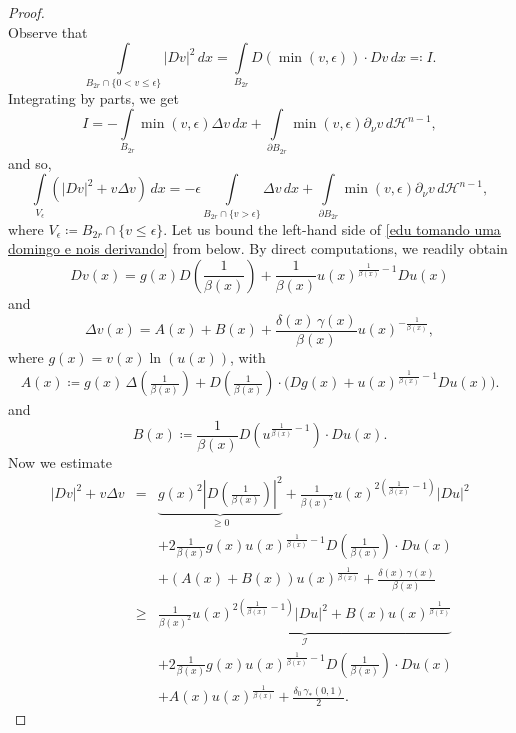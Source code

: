\documentclass[10pt,a4paper]{amsart}
\begin{document}
\begin{proof}
$$$$
Observe that
$$
    \int\limits_{B_{2r} \cap \{0 < v \leq \epsilon \}} |Dv|^2\,dx  = \int\limits_{B_{2r}} D(\min(v,\epsilon)) \cdot Dv\,dx \eqqcolon I.
$$
Integrating by parts, we get
$$
    I = - \int\limits_{B_{2r}} \min(v,\epsilon) \Delta v\,dx + \int\limits_{\partial B_{2r}} \min(v,\epsilon) \partial_\nu v\,d\mathcal{H}^{n-1} ,
$$
and so,
\begin{equation}\label{edu tomando uma domingo e nois derivando}
     \int\limits_{V_\epsilon} \left(|Dv|^2 + v\Delta v\right)\,dx = - \epsilon \int\limits_{B_{2r} \cap \{v > \epsilon \}}\Delta v\,dx + \int\limits_{\partial B_{2r}} \min(v,\epsilon) \partial_\nu v\,d\mathcal{H}^{n-1},
\end{equation}
where $V_\epsilon \coloneqq B_{2r} \cap \{v \leq \epsilon \}$. Let us bound the left-hand side of \eqref{edu tomando uma domingo e nois derivando} from below. By direct computations, we readily obtain
$$
    Dv(x)  =   g(x)D \left(\frac{1}{\beta(x)} \right) + \frac{1}{\beta(x)}u(x)^{\frac{1}{\beta(x)} - 1}Du(x)
$$
and
$$
    \Delta v(x)  =  A(x) + B(x) + \frac{\delta(x)\, \gamma(x)}{\beta(x)} u(x)^{-\frac{1}{\beta(x)}},
$$
where $g(x) = v(x) \ln(u(x))$, with 
\begin{eqnarray*}
A(x) \coloneqq g(x)\,\Delta\!\left(\tfrac{1}{\beta(x)}\right)
+ D\!\left(\tfrac{1}{\beta(x)}\right)\!\cdot\Big(Dg(x)+u(x)^{\frac{1}{\beta(x)}-1}Du(x)\Big).
\end{eqnarray*}
and
$$
    B(x) \coloneqq \frac{1}{\beta(x)} D\left(u^{\frac{1}{\beta(x)}-1}\right) \cdot Du(x).
$$
Now we estimate
\begin{eqnarray*}
|Dv|^2 + v \Delta v & = & \displaystyle \underbrace{g(x)^2\left|D\left(\frac{1}{\beta(x)}\right)\right|^2}_{\geq 0} + \frac{1}{\beta(x)^2}u(x)^{2\left(\frac{1}{\beta(x)}-1\right)}|Du|^2 \\
         & & +    2\frac{1}{\beta(x)}g(x)u(x)^{\frac{1}{\beta(x)} - 1}D\left(\frac{1}{\beta(x)}\right) \cdot Du(x)\\
         & & +  (A(x) + B(x))u(x)^{\frac{1}{\beta(x)}} + \frac{\delta(x)\, \gamma(x)}{\beta(x)}\\
         & \geq & \underbrace{\frac{1}{\beta(x)^2}u(x)^{2\left(\frac{1}{\beta(x)}-1\right)}|Du|^2 +  B(x) u(x)^{\frac{1}{\beta(x)}}}_{\mathcal{I}}\\
         & & +   2\frac{1}{\beta(x)}g(x)u(x)^{\frac{1}{\beta(x)} - 1}D\left(\frac{1}{\beta(x)}\right) \cdot Du(x)\\
         & & +   A(x)u(x)^{\frac{1}{\beta(x)}} + \frac{\delta_0 \, \gamma_\ast (0,1)}{2}.
\end{eqnarray*}

\end{proof}
\end{document}
